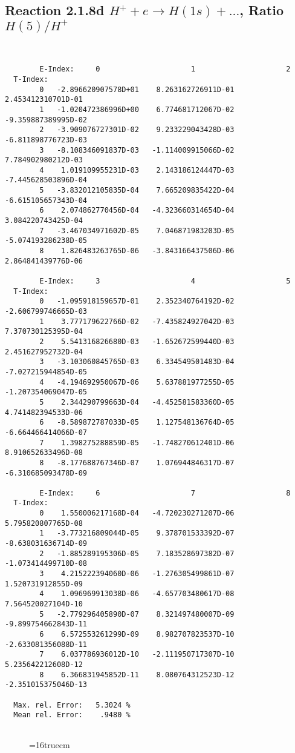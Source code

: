 \documentclass[12pt]{article}
\begin{document}
\subsection{
Reaction 2.1.8d  $H^+ + e \rightarrow H(1s) + ...$,  Ratio $H(5)/H^+$
}

\begin{small}\begin{verbatim}


        E-Index:     0                     1                     2
  T-Index:
        0   -2.896620907578D+01    8.263162726911D-01    2.453412310701D-01
        1   -1.020472386996D+00    6.774681712067D-02   -9.359887389995D-02
        2   -3.909076727301D-02    9.233229043428D-03   -6.811898776723D-03
        3   -8.108346091837D-03   -1.114009915066D-02    7.784902980212D-03
        4    1.019109955231D-03    2.143186124447D-03   -7.445628503896D-04
        5   -3.832012105835D-04    7.665209835422D-04   -6.615105657343D-04
        6    2.074862770456D-04   -4.323660314654D-04    3.084220743425D-04
        7   -3.467034971602D-05    7.046871983203D-05   -5.074193286238D-05
        8    1.826483263765D-06   -3.843166437506D-06    2.864841439776D-06

        E-Index:     3                     4                     5
  T-Index:
        0   -1.095918159657D-01    2.352340764192D-02   -2.606799746665D-03
        1    3.777179622766D-02   -7.435824927042D-03    7.370730125395D-04
        2    5.541316826680D-03   -1.652672599440D-03    2.451627952732D-04
        3   -3.103060845765D-03    6.334549501483D-04   -7.027215944854D-05
        4   -4.194692950067D-06    5.637881977255D-05   -1.207354069047D-05
        5    2.344290799663D-04   -4.452581583360D-05    4.741482394533D-06
        6   -8.589872787033D-05    1.127548136764D-05   -6.664466414066D-07
        7    1.398275288859D-05   -1.748270612401D-06    8.910652633496D-08
        8   -8.177688767346D-07    1.076944846317D-07   -6.310685093478D-09

        E-Index:     6                     7                     8
  T-Index:
        0    1.550006217168D-04   -4.720230271207D-06    5.795820807765D-08
        1   -3.773216809044D-05    9.378701533392D-07   -8.638031636714D-09
        2   -1.885289195306D-05    7.183528697382D-07   -1.073414499710D-08
        3    4.215222394060D-06   -1.276305499861D-07    1.520731912855D-09
        4    1.096969913038D-06   -4.657703480617D-08    7.564520027104D-10
        5   -2.779296405890D-07    8.321497480007D-09   -9.899754662843D-11
        6    6.572553261299D-09    8.982707823537D-10   -2.633081356088D-11
        7    6.037786936012D-10   -2.111950717307D-10    5.235642212608D-12
        8    6.366831945852D-11    8.080764312523D-12   -2.351015375046D-13

  Max. rel. Error:   5.3024 %
  Mean rel. Error:    .9480 %


\end{verbatim}\end{small}
\begin{figure} \label{2.1.8rd}
\epsfxsize=16truecm
\end{figure}
\newpage
\end{document}
